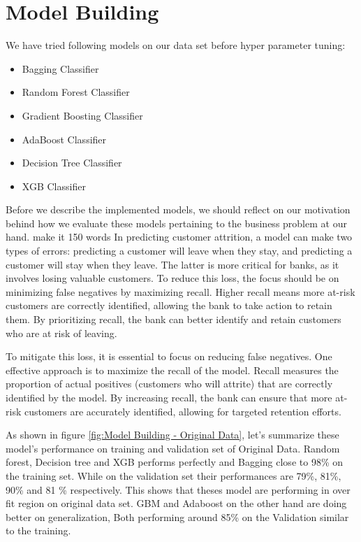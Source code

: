 \documentclass[10pt,a4paper]{style}
\begin{document}
\section{Model Building}
We have tried following models on our data set before hyper parameter tuning:
\begin{itemize}
	\item Bagging Classifier
	\item Random Forest Classifier
	\item Gradient Boosting Classifier
	\item AdaBoost Classifier
	\item Decision Tree Classifier
	\item XGB Classifier
\end{itemize}
Before we describe the implemented models, we should reflect on our motivation behind how we evaluate these models pertaining to the business problem at our hand. make it 150 words
In predicting customer attrition, a model can make two types of errors: predicting a customer will leave when they stay, and predicting a customer will stay when they leave. The latter is more critical for banks, as it involves losing valuable customers. To reduce this loss, the focus should be on minimizing false negatives by maximizing recall. Higher recall means more at-risk customers are correctly identified, allowing the bank to take action to retain them. By prioritizing recall, the bank can better identify and retain customers who are at risk of leaving.

To mitigate this loss, it is essential to focus on reducing false negatives. One effective approach is to maximize the recall of the model. Recall measures the proportion of actual positives (customers who will attrite) that are correctly identified by the model. By increasing recall, the bank can ensure that more at-risk customers are accurately identified, allowing for targeted retention efforts.

As shown in figure \ref{fig:Model Building - Original Data}, let's summarize these model's performance on training and validation set of Original Data. Random forest, Decision tree and XGB performs perfectly and Bagging close to 98\% on the training set. While on the validation set their performances are 79\%, 81\%, 90\% and 81 \% respectively. This shows that theses model are performing in over fit region on original data set. GBM and Adaboost on the other hand are doing better on generalization, Both performing around 85\% on the Validation similar to the training.     
\end{document}
